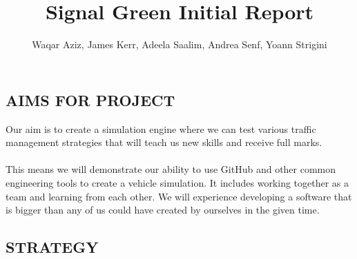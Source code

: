 \documentclass[11pt]{article}
\begin{document}
\title{Signal Green Initial Report}

\author{Waqar Aziz, James Kerr, Adeela Saalim, Andrea Senf, Yoann Strigini}

\maketitle 

\section*{}

\subsection*{AIMS FOR PROJECT}



Our aim is to create a simulation engine where we can test various traffic management 
strategies that will teach us new skills and receive full marks. 
\\ \\
This means we will demonstrate our ability to use GitHub and other common engineering 
tools to create a vehicle simulation. It includes working together as a team and learning 
from each other. We will experience developing a software that 
is bigger than any of us could have created by ourselves in the given time. 


\subsection*{STRATEGY}
\end{document}

